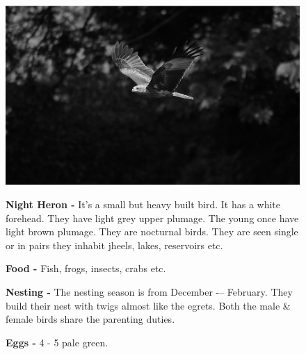 \begin{figure}[H]
\begin{center}
\includegraphics{figure/Land_birds/01_pariah_kite/pariah-kite.eps}
\end{center}
\medskip
\noindent
{\bf Night Heron -} It's a small but heavy built bird. It has a white forehead. They have light grey upper plumage. The young once have light brown plumage. They are nocturnal birds. They are seen single or in pairs they inhabit jheels, lakes, reservoirs etc.

\medskip
{\bf Food -} Fish, frogs, insects, crabs etc.

{\bf Nesting -} The nesting season is from December -– February. They build their nest with twigs almost like the egrets. Both the male \& female birds share the parenting duties.

{\bf Eggs -} 4 - 5 pale green.
\end{figure}

\vfill\eject

~\phantom{a}
\vfill


